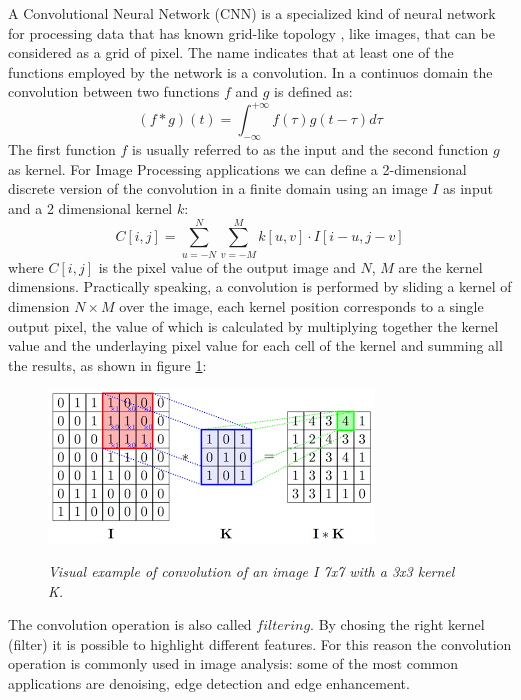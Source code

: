 \documentclass[12pt,a4paper]{report}
\begin{document}
A Convolutional Neural Network (CNN) is a specialized kind of neural network for processing data that has known grid-like topology \cite{Goodfellow-et-al-2016}, like images, that can be considered as a grid of pixel.
The name indicates that at least one of the functions employed by the network is a convolution. In a continuos domain the convolution between two functions $f$ and $g$ is defined as: 
\begin{equation}
 (f * g)(t) = \int_{-\infty}^{+\infty} f(\tau)g(t-\tau)d\tau
\end{equation}
The first function $f$ is usually referred to as the input and the second function $g$ as kernel. 
For Image Processing applications we can define a 2-dimensional discrete version of the convolution in a finite domain using an image $I$ as input and a 2 dimensional kernel $k$:
\begin{equation}
 C[i, j] = \sum_{u=-N}^N \sum_{v=-M}^M k[u, v] \cdot I[i-u, j-v]
 \label{eq:conv}
\end{equation}
where $C[i, j]$ is the pixel value of the output image and $N$, $M$ are the kernel dimensions.
Practically speaking, a convolution is performed by sliding a kernel of dimension $N \times M$ over the image, each kernel position corresponds to a single output pixel, the value of which is calculated by multiplying together the kernel value and the underlaying pixel value for each cell of the kernel and summing all the results, as shown in figure \ref{fig:convolution}:

\begin{figure}[h]
 \centering
 \includegraphics[scale=1.]{./images/conv.png}
 \label{fig:convolution}
 \caption{\it Visual example of convolution of an image I 7x7 with a 3x3 kernel K.}
\end{figure}

The convolution operation is also called $filtering$. By chosing the right kernel (filter) it is possible to highlight different features. For this reason the convolution operation is commonly used in image analysis: some of the most common applications are denoising, edge detection and edge enhancement. 
\end{document}
